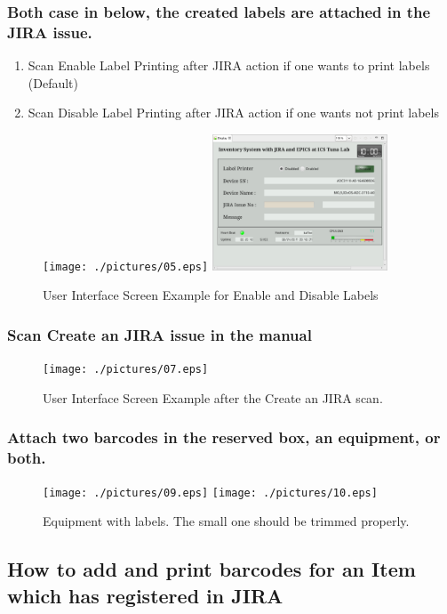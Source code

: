 \documentclass[11pt
  , a4paper
  , article
  , oneside
  , showtrims
]{memoir}
\begin{document}
\clearpage
\subsubsection{Both case in below, the created labels are attached in the JIRA issue.}

\begin{enumerate}
\item Scan Enable Label Printing after JIRA action if one wants to print labels (Default)
\item Scan Disable Label Printing after JIRA action if one wants not print labels
\end{enumerate}
\begin{figure}[!htb]
    \centering
    \texttt{[image: ./pictures/05.eps]}
    \includegraphics[width=0.466\textwidth]{./pictures/06.eps}
  \caption{
    User Interface Screen Example for Enable and Disable Labels
  }
\end{figure}

\subsubsection{Scan Create an JIRA issue in the manual}
\begin{figure}[!htb]
  \centering
  \texttt{[image: ./pictures/07.eps]}
  \caption{
    User Interface Screen Example after the Create an JIRA scan. 
  }
\end{figure}

\clearpage
\subsubsection{Attach two barcodes in the reserved box, an equipment, or both.}
\begin{figure}[!htb]
    \centering
    \texttt{[image: ./pictures/09.eps]}
    \texttt{[image: ./pictures/10.eps]}
  \caption{
    Equipment with labels. The small one should be trimmed properly. 
  }
\end{figure}

\subsection{How to add and print barcodes for an Item which has registered in JIRA}
\end{document}
